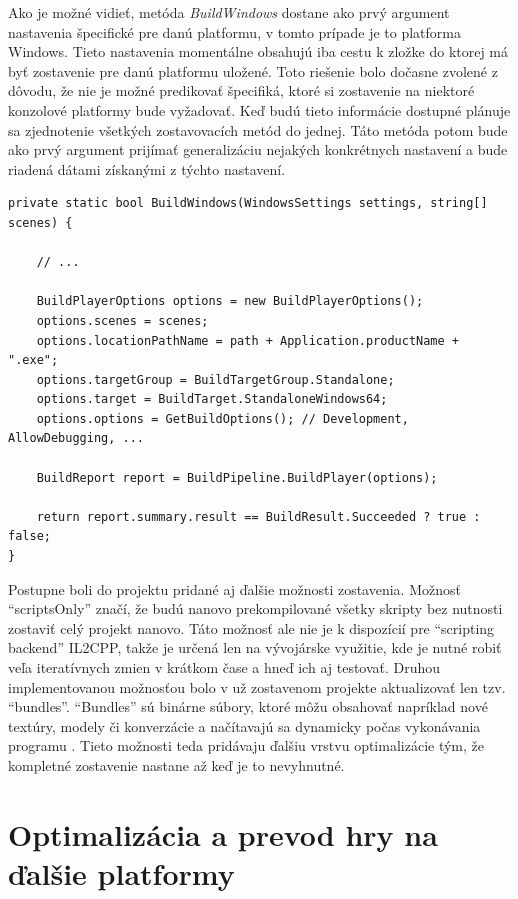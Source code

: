 \documentclass[slovak, bachelorpractice]{diploma}
\begin{document}
Ako je možné vidieť, metóda \textit{BuildWindows} dostane ako prvý argument nastavenia špecifické pre danú platformu, v tomto prípade je to platforma Windows. Tieto nastavenia momentálne obsahujú iba cestu k zložke do ktorej má byť zostavenie pre danú platformu uložené. Toto riešenie bolo dočasne zvolené z dôvodu, že nie je možné predikovať špecifiká, ktoré si zostavenie na niektoré konzolové platformy bude vyžadovať. Keď budú tieto informácie dostupné plánuje sa zjednotenie všetkých zostavovacích metód do jednej. Táto metóda potom bude ako prvý argument prijímať generalizáciu nejakých konkrétnych nastavení a bude riadená dátami získanými z týchto nastavení.

\vspace{10pt}
\begin{lstlisting}[label=src:bwin,caption={Extrahovanie zvolených scén pomocou masky}]
private static bool BuildWindows(WindowsSettings settings, string[] scenes) {

	// ...
	
    BuildPlayerOptions options = new BuildPlayerOptions();
    options.scenes = scenes;
    options.locationPathName = path + Application.productName + ".exe";
    options.targetGroup = BuildTargetGroup.Standalone;
    options.target = BuildTarget.StandaloneWindows64;
    options.options = GetBuildOptions(); // Development, AllowDebugging, ...

    BuildReport report = BuildPipeline.BuildPlayer(options);
    
    return report.summary.result == BuildResult.Succeeded ? true : false;
}
\end{lstlisting}

Postupne boli do projektu pridané aj ďalšie možnosti zostavenia. Možnosť \enquote{scriptsOnly} značí, že budú nanovo prekompilované všetky skripty bez nutnosti zostaviť celý projekt nanovo. Táto možnosť ale nie je k dispozícií pre \enquote{scripting backend} IL2CPP, takže je určená len na vývojárske využitie, kde je nutné robiť veľa iteratívnych zmien v krátkom čase a hneď ich aj testovať. Druhou implementovanou možnosťou bolo v už zostavenom projekte aktualizovať len tzv. \enquote{bundles}. \enquote{Bundles} sú binárne súbory, ktoré môžu obsahovať napríklad nové textúry, modely či konverzácie a načítavajú sa dynamicky počas vykonávania programu \cite{Bundles}. Tieto možnosti teda pridávaju ďalšiu vrstvu optimalizácie tým, že kompletné zostavenie nastane až keď je to nevyhnutné.

\section{Optimalizácia a prevod hry na ďalšie platformy}
\label{sec:Port}
\end{document}

